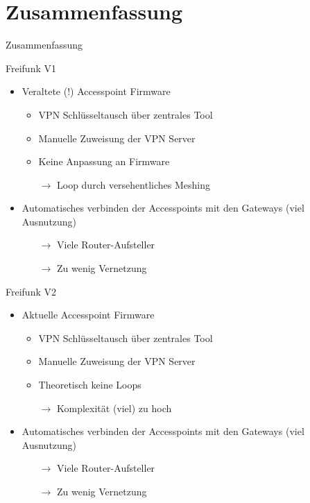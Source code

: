\section{Zusammenfassung}
\begin{frame}{}
    \begin{center}
        Zusammenfassung
     \end{center}
\end{frame}

\begin{frame}{Freifunk V1}
    \begin{itemize}
        \item Veraltete (!) Accesspoint Firmware
        \begin{itemize}
            \item VPN Schlüsseltausch über zentrales Tool
            \item Manuelle Zuweisung der VPN Server
            \item Keine Anpassung an Firmware
            \item[$\rightarrow$] Loop durch versehentliches Meshing
        \end{itemize}
        \item Automatisches verbinden der Accesspoints mit den Gateways (viel Ausnutzung)
        \begin{itemize}
            \item[$\rightarrow$] Viele Router-Aufsteller
            \item[$\rightarrow$] Zu wenig Vernetzung
        \end{itemize}
    \end{itemize}
\end{frame}

\begin{frame}{Freifunk V2}
    \begin{itemize}
        \item Aktuelle Accesspoint Firmware
        \begin{itemize}
            \item VPN Schlüsseltausch über zentrales Tool
            \item Manuelle Zuweisung der VPN Server
            \item Theoretisch keine Loops
            \item[$\rightarrow$] Komplexität (viel) zu hoch
        \end{itemize}
        \item Automatisches verbinden der Accesspoints mit den Gateways (viel Ausnutzung)
        \begin{itemize}
            \item[$\rightarrow$] Viele Router-Aufsteller
            \item[$\rightarrow$] Zu wenig Vernetzung
        \end{itemize}
    \end{itemize}
\end{frame}

